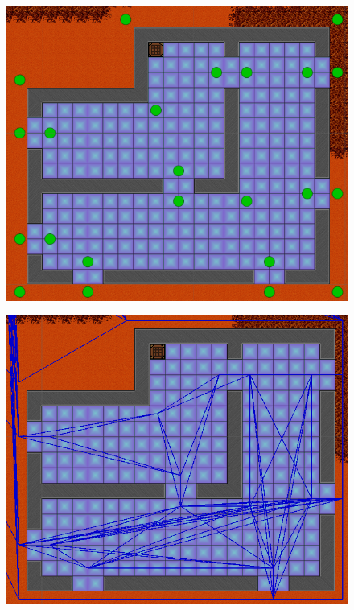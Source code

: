 \begin{figure}[H]
\centering
	\begin{minipage}{.5\textwidth}
		\centering
		\includegraphics[scale=0.3]{figures/astar/optimizedWaypoints}
		\label{waypointOpt}
	\end{minipage}%
	\begin{minipage}{.5\textwidth}
		\centering
		\includegraphics[scale=0.315]{figures/astar/optimizedWaypointsGraph}
		\label{waypointgraphOpt}
	\end{minipage}
\end{figure}

